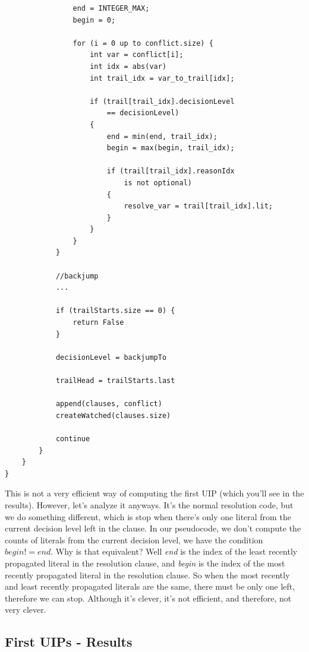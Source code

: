 \documentclass[oneside]{book}
\begin{document}
\begin{lstlisting}
                end = INTEGER_MAX;
                begin = 0;

                for (i = 0 up to conflict.size) {
                    int var = conflict[i];
                    int idx = abs(var)
                    int trail_idx = var_to_trail[idx];

                    if (trail[trail_idx].decisionLevel 
                        == decisionLevel)
                    {
                        end = min(end, trail_idx);
                        begin = max(begin, trail_idx);

                        if (trail[trail_idx].reasonIdx 
                            is not optional)
                        {
                            resolve_var = trail[trail_idx].lit;
                        }
                    }
                }
            } 

            //backjump
            ...

            if (trailStarts.size == 0) {
                return False
            }

            decisionLevel = backjumpTo

            trailHead = trailStarts.last

            append(clauses, conflict)
            createWatched(clauses.size)

            continue
        }
    }
}
\end{lstlisting}

This is not a very efficient way of computing the first UIP (which you'll see in the 
results). However, let's analyze it anyways. It's the normal resolution code, but we 
do something different, which is stop when there's only one literal from the current 
decision level left in the clause. In our pseudocode, we don't compute the counts of 
literals from the current decision level, we have the condition $begin != end$. Why is 
that equivalent? Well \textit{end} is the index of the least recently propagated literal 
in the resolution clause, and \textit{begin} is the index of the most recently propagated 
literal in the resolution clause. So when the most recently and least recently propagated 
literals are the same, there must be only one left, therefore we can stop. Although it's 
clever, it's not efficient, and therefore, not very clever.

\subsection{First UIPs - Results}
\end{document}
